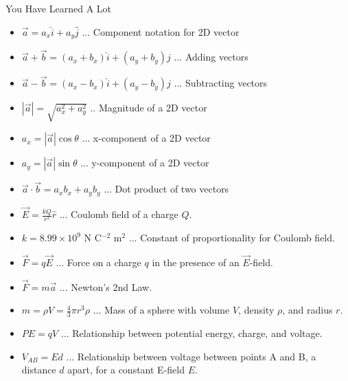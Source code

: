 \documentclass{beamer}
\begin{document}
\begin{frame}{You Have Learned A Lot}
\scriptsize
\begin{itemize}
\item $\vec{a} = a_x \hat{i} + a_y \hat{j}$ ... Component notation for 2D vector
\item $\vec{a} + \vec{b} = (a_x + b_x)\hat{i} + (a_y + b_y)\hat{j}$ ... Adding vectors
\item $\vec{a} - \vec{b} = (a_x - b_x)\hat{i} + (a_y - b_y)\hat{j}$ ... Subtracting vectors
\item $|\vec{a}| = \sqrt{a_x^2 + a_y^2}$ .. Magnitude of a 2D vector
\item $a_x = |\vec{a}|\cos\theta$ ... x-component of a 2D vector
\item $a_y = |\vec{a}|\sin\theta$ ... y-component of a 2D vector
\item $\vec{a} \cdot \vec{b} = a_x b_x + a_y b_y$ ... Dot product of two vectors
\end{itemize}
\begin{itemize}
\item $\vec{E} = \frac{k Q}{r^2} \hat{r}$ ... Coulomb field of a charge $Q$.
\item $k = 8.99 \times 10^{9}$ N C$^{-2}$ m$^{2}$ ... Constant of proportionality for Coulomb field.
\item $\vec{F} = q \vec{E}$ ... Force on a charge $q$ in the presence of an $\vec{E}$-field.
\item $\vec{F} = m\vec{a}$ ... Newton's 2nd Law.
\item $m = \rho V = \frac{4}{3}\pi r^3 \rho$ ... Mass of a sphere with volume $V$, density $\rho$, and radius $r$.
\item $PE = q V$ ... Relationship between potential energy, charge, and voltage.
\item $V_{AB} = Ed$ ... Relationship between voltage between points A and B, a distance $d$ apart, for a constant E-field $E$.
\end{itemize}
\end{frame}
\end{document}
